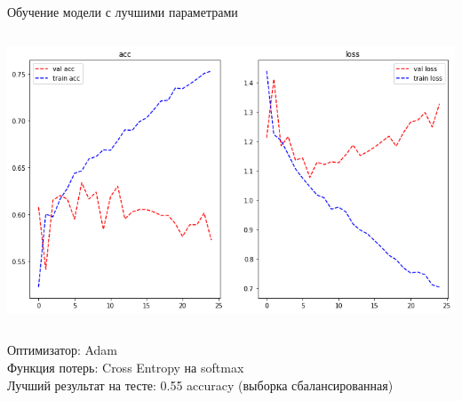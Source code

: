 \documentclass[c, aspectratio = 43]{beamer}
\begin{document}
        \begin{frame}
        	Обучение модели с лучшими параметрами
        	\begin{columns}
        	\includegraphics[width=\linewidth]{rnn_train.png}
        	\begin{table}[]
        	\end{table}
        \end{columns}
    Оптимизатор: Adam\\
    Функция потерь: Cross Entropy на softmax\\
    Лучший результат на тесте: 0.55 accuracy (выборка сбалансированная)
        \end{frame}
        
\end{document}
